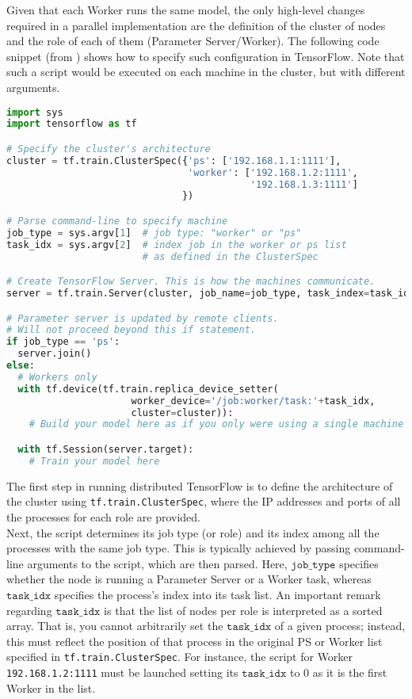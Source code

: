 Given that each Worker runs the same model, the only high-level changes required in a parallel implementation are the definition of the cluster of nodes and the role of each of them (Parameter Server/Worker).
The following code snippet (from \cite{dist_tf_intro}) shows how to specify such configuration in TensorFlow.
Note that such a script would be executed on each machine in the cluster, but with different arguments.

\begin{lstlisting}[label=listing:tfdist, language=Python, caption=Distributed TensorFlow skeleton.]
import sys
import tensorflow as tf

# Specify the cluster's architecture
cluster = tf.train.ClusterSpec({'ps': ['192.168.1.1:1111'],
                                'worker': ['192.168.1.2:1111',
                                           '192.168.1.3:1111']
                               })

# Parse command-line to specify machine
job_type = sys.argv[1]  # job type: "worker" or "ps"
task_idx = sys.argv[2]  # index job in the worker or ps list
                        # as defined in the ClusterSpec

# Create TensorFlow Server. This is how the machines communicate.
server = tf.train.Server(cluster, job_name=job_type, task_index=task_idx)

# Parameter server is updated by remote clients.
# Will not proceed beyond this if statement.
if job_type == 'ps':
  server.join()
else:
  # Workers only
  with tf.device(tf.train.replica_device_setter(
                      worker_device='/job:worker/task:'+task_idx,
                      cluster=cluster)):
    # Build your model here as if you only were using a single machine

  with tf.Session(server.target):
    # Train your model here
\end{lstlisting}

The first step in running distributed TensorFlow is to define the architecture of the cluster using \texttt{tf.train.ClusterSpec}, where the IP addresses and ports of all the processes for each role are provided.\\
% 
Next, the script determines its job type (or role) and its index among all the processes with the same job type.
This is typically achieved by passing command-line arguments to the script, which are then parsed. 
Here, $\texttt{job\_type}$ specifies whether the node is running a Parameter Server or a Worker task, whereas $\texttt{task\_idx}$ specifies the process's index into its task list. 
An important remark regarding $\texttt{task\_idx}$ is that the list of nodes per role is interpreted as a sorted array.
That is, you cannot arbitrarily set the $\texttt{task\_idx}$ of a given process; instead, this must reflect the position of that process in the original PS or Worker list specified in \texttt{tf.train.ClusterSpec}.
For instance, the script for Worker \texttt{192.168.1.2:1111} must be launched setting its $\texttt{task\_idx}$ to $0$ as it is the first Worker in the list.\\[-0.2cm]

